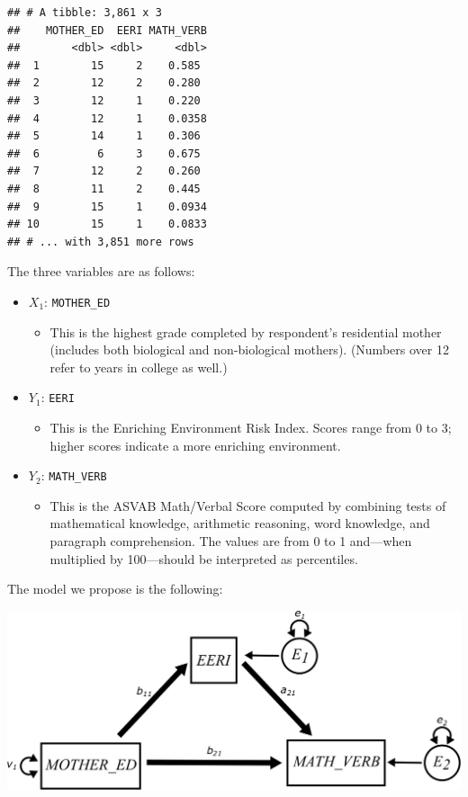 \documentclass[
]{book}
\providecommand{\tightlist}{%
  \setlength{\itemsep}{0pt}\setlength{\parskip}{0pt}}
\begin{document}
\begin{verbatim}
## # A tibble: 3,861 x 3
##    MOTHER_ED  EERI MATH_VERB
##        <dbl> <dbl>     <dbl>
##  1        15     2    0.585 
##  2        12     2    0.280 
##  3        12     1    0.220 
##  4        12     1    0.0358
##  5        14     1    0.306 
##  6         6     3    0.675 
##  7        12     2    0.260 
##  8        11     2    0.445 
##  9        15     1    0.0934
## 10        15     1    0.0833
## # ... with 3,851 more rows
\end{verbatim}

The three variables are as follows:

\begin{itemize}
\tightlist
\item
  \(X_{1}\): \texttt{MOTHER\_ED}

  \begin{itemize}
  \tightlist
  \item
    This is the highest grade completed by respondent's residential mother (includes both biological and non-biological mothers). (Numbers over 12 refer to years in college as well.)
  \end{itemize}
\item
  \(Y_{1}\): \texttt{EERI}

  \begin{itemize}
  \tightlist
  \item
    This is the Enriching Environment Risk Index. Scores range from 0 to 3; higher scores indicate a more enriching environment.
  \end{itemize}
\item
  \(Y_{2}\): \texttt{MATH\_VERB}

  \begin{itemize}
  \tightlist
  \item
    This is the ASVAB Math/Verbal Score computed by combining tests of mathematical knowledge, arithmetic reasoning, word knowledge, and paragraph comprehension. The values are from 0 to 1 and---when multiplied by 100---should be interpreted as percentiles.
  \end{itemize}
\end{itemize}

The model we propose is the following:

\begin{center}\includegraphics{graphics/mediation_nls97} \end{center}
\end{document}
